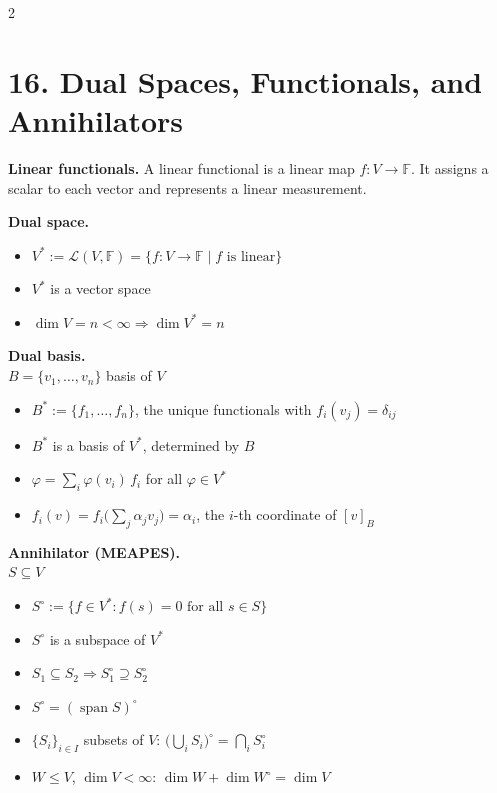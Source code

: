 \documentclass[fleqn]{article}
\newcommand{\subhead}[1]{\medskip\noindent\textbf{#1}}
\begin{document}
\begin{multicols}{2}
\section*{16. Dual Spaces, Functionals, and Annihilators}

\subhead{Linear functionals.}
A linear functional is a linear map $f:V \to \mathbb{F}$. It assigns a scalar to each vector and represents a linear measurement.

\subhead{Dual space.}
\begin{itemize}
\item $V^* := \mathcal{L}(V,\mathbb{F}) = \{ f: V \to \mathbb{F} \mid f \text{ is linear} \}$
\item $V^*$ is a vector space
\item $\dim V = n < \infty \Rightarrow \dim V^* = n$
\end{itemize}

\subhead{Dual basis.}\\
$B=\{v_1,\dots,v_n\}$ basis of $V$
\begin{itemize}
\item $B^* := \{f_1,\dots,f_n\}$, the unique functionals with $f_i(v_j)=\delta_{ij}$
\item $B^*$ is a basis of $V^*$, determined by $B$
\item $\varphi = \sum_i \varphi(v_i)\,f_i$ for all $\varphi \in V^*$
\item $f_i(v) = f_i\big(\sum_j \alpha_j v_j\big) = \alpha_i$, the $i$-th coordinate of $[v]_B$
\end{itemize}

\subhead{Annihilator (MEAPES).}\\
$S \subseteq V$
\begin{itemize}
\item $S^{\circ} := \{f \in V^* : f(s)=0 \text{ for all } s \in S\}$
\item $S^{\circ}$ is a subspace of $V^*$
\item $S_1 \subseteq S_2 \Rightarrow S_1^{\circ} \supseteq S_2^{\circ}$
\item $S^{\circ} = (\operatorname{span} S)^{\circ}$
\item $\{S_i\}_{i \in I}$ subsets of $V$: $\big(\bigcup_i S_i\big)^{\circ} = \bigcap_i S_i^{\circ}$
\item $W \le V$, $\dim V<\infty$: $\dim W + \dim W^{\circ} = \dim V$
\end{itemize}


\end{multicols}
\end{document}

